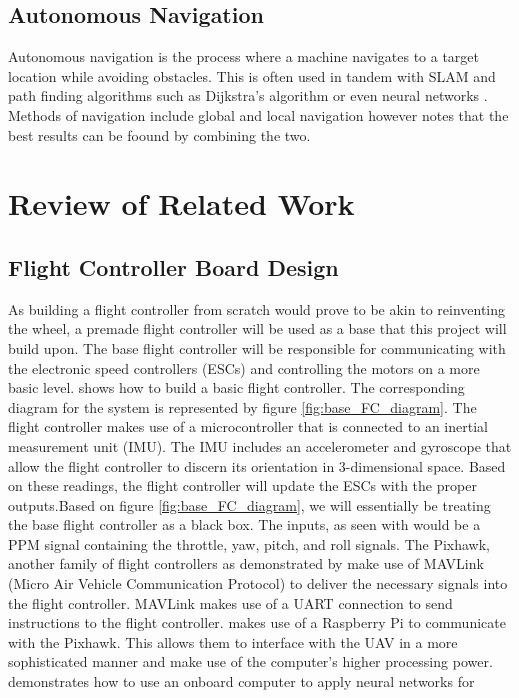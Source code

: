 \documentclass[english]{upeeei}
\begin{document}
\section{Autonomous Navigation}
Autonomous navigation is the process where a machine navigates to a target location while avoiding obstacles. This is
often used in tandem with SLAM and path finding algorithms such as Dijkstra's algorithm or even neural networks 
\cite{Dowling2018}. Methods of navigation include global and local navigation however \cite{Dowling2018} notes that the
best results can be foound by combining the two.

\chapter{Review of Related Work}
\section{Flight Controller Board Design}
As building a flight controller from scratch would prove to be akin to reinventing the wheel, a premade flight controller
will be used as a base that this project will build upon. The base flight controller will be responsible for communicating
with the electronic speed controllers (ESCs) and controlling the motors on a more basic level. \cite{MultiwiiFC} shows how
to build a basic flight controller. The corresponding diagram for the system is represented by figure
\ref{fig:base_FC_diagram}. The flight controller makes use of a microcontroller that is connected to an inertial
measurement unit (IMU). The IMU includes an accelerometer and gyroscope that allow the flight controller to discern its 
orientation in 3-dimensional space. Based on these readings, the flight controller will update the ESCs with the proper
outputs.Based on figure \ref{fig:base_FC_diagram}, we will essentially be treating the base flight controller as a black
box. The inputs, as seen with \cite{MultiwiiFC} would be a PPM signal containing the throttle, yaw, pitch, and roll signals.
The Pixhawk, another family of flight controllers as demonstrated by \cite{RPiMavlink2019} make use of MAVLink (Micro Air
Vehicle Communication Protocol) to deliver the necessary signals into the flight controller. MAVLink makes use of a UART
connection to send instructions to the flight controller. \cite{RPiMavlink2019} makes use of a Raspberry Pi to communicate
with the Pixhawk. This allows them to interface with the UAV in a more sophisticated manner and make use of the computer's
higher processing power. \cite{Redtail2017} demonstrates how to use an onboard computer to apply neural networks for
\end{document}
